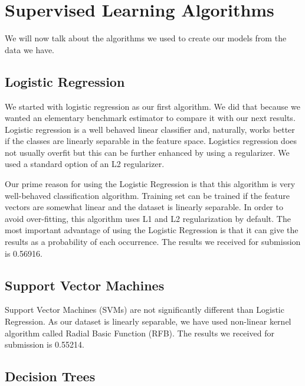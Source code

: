 \documentclass[conference, onecolumn]{IEEEtran}
\begin{document}

\section{Supervised Learning Algorithms}

We will now talk about the algorithms we used to create our models from the data we have.


\subsection{Logistic Regression}

We started with logistic regression as our first algorithm. We did that because we wanted an elementary benchmark estimator to compare it with our next results. Logistic regression is a well behaved linear classifier and, naturally, works better if the classes are linearly separable in the feature space. Logistics regression does not usually overfit but this can be further enhanced by using a regularizer. We used a standard option of an L2 regularizer.

 
Our prime reason for using the Logistic Regression is that this algorithm is very well-behaved classification algorithm. Training set can be trained if the feature vectors are somewhat linear and the dataset is linearly separable. In order to avoid over-fitting, this algorithm uses L1 and L2 regularization by default. The most important advantage of using the Logistic Regression is that it can give the results as a probability of each occurrence. The results we received for submission is 0.56916.



\subsection{Support Vector Machines}

Support Vector Machines (SVMs) are not significantly different than Logistic Regression. As our dataset is linearly separable, we have used non-linear kernel algorithm called Radial Basic Function (RFB). The results we received for submission is 0.55214.

\subsection{Decision Trees}
\end{document}
